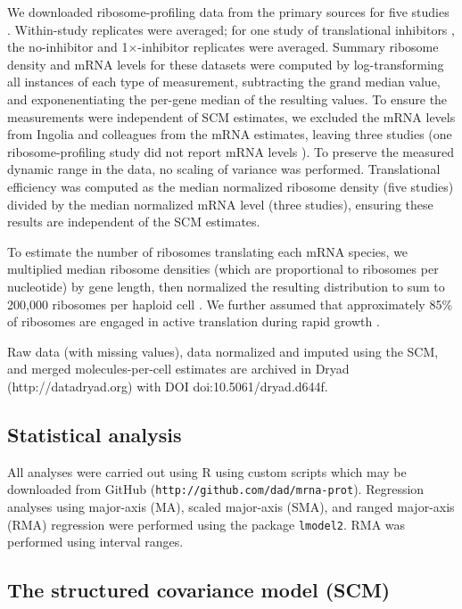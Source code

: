 \documentclass[10pt]{article}
\begin{document}
We downloaded ribosome-profiling data from the primary sources for five studies \cite{ingolia09, gerashchenko12, Gerashchenko2014, McManus2014, Subtelny2014}. Within-study replicates were averaged; for one study of translational inhibitors \cite{Gerashchenko2014}, the no-inhibitor and 1$\times$-inhibitor replicates were averaged. Summary ribosome density and mRNA levels for these datasets were computed by log-transforming all instances of each type of measurement, subtracting the grand median value, and exponenentiating the per-gene median of the resulting values. To ensure the measurements were independent of SCM estimates, we excluded the mRNA levels from Ingolia and colleagues from the mRNA estimates, leaving three studies (one ribosome-profiling study did not report mRNA levels \cite{Gerashchenko2014}). To preserve the measured dynamic range in the data, no scaling of variance was performed. Translational efficiency was computed as the median normalized ribosome density (five studies) divided by the median normalized mRNA level (three studies), ensuring these results are independent of the SCM estimates.

To estimate the number of ribosomes translating each mRNA species, we multiplied median ribosome densities (which are proportional to ribosomes per nucleotide) by gene length, then normalized the resulting distribution to sum to 200,000 ribosomes per haploid cell \cite{Warner1999}. We further assumed that approximately 85\% of ribosomes are engaged in active translation during rapid growth \cite{Frank1978}.

Raw data (with missing values), data normalized and imputed using the SCM, and merged molecules-per-cell estimates are archived in Dryad (http://datadryad.org) with DOI doi:10.5061/dryad.d644f.

\subsection*{Statistical analysis}

All analyses were carried out using R \cite{rcore14} using custom scripts which may be downloaded from GitHub (\texttt{http://github.com/dad/mrna-prot}). Regression analyses using major-axis (MA), scaled major-axis (SMA), and ranged major-axis (RMA) regression were performed using the package \texttt{lmodel2}. RMA was performed using interval ranges.

\subsection*{The structured covariance model (SCM)}
\end{document}
